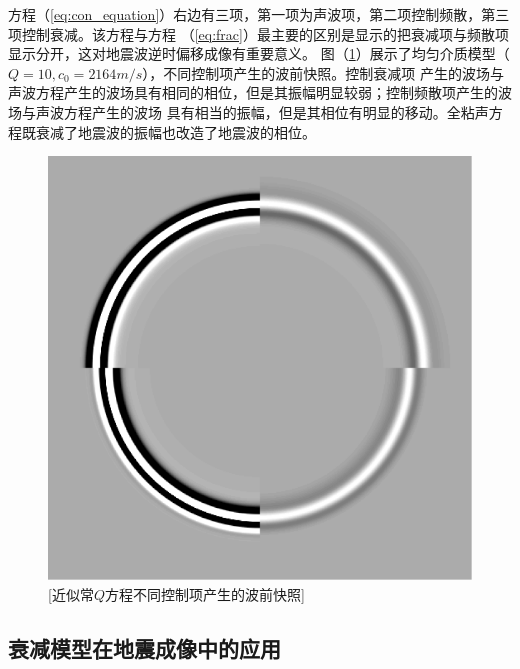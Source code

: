 方程（\ref{eq:con_equation}）右边有三项，第一项为声波项，第二项控制频散，第三项控制衰减。该方程与方程
（\ref{eq:frac}）最主要的区别是显示的把衰减项与频散项显示分开，这对地震波逆时偏移成像有重要意义。
图（\ref{fig:wave_frac}）展示了均匀介质模型（$Q=10,c_0=2164m/s$），不同控制项产生的波前快照。控制衰减项
产生的波场与声波方程产生的波场具有相同的相位，但是其振幅明显较弱；控制频散项产生的波场与声波方程产生的波场
具有相当的振幅，但是其相位有明显的移动。全粘声方程既衰减了地震波的振幅也改造了地震波的相位。
\begin{figure}[!htbp]
	    \centering
		\includegraphics[width=0.5\linewidth]{figure/wave_frac}
		[近似常$Q$方程不同控制项产生的波前快照]
		\label{fig:wave_frac}
\end{figure}







\vspace{0.5cm}
\subsection{衰减模型在地震成像中的应用}

